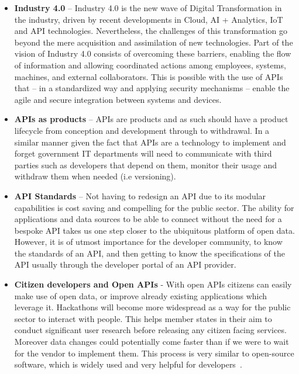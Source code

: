 \begin{itemize}
	\item \textbf{Industry 4.0} – Industry 4.0 is the new wave of Digital Transformation in the industry, driven by recent developments in Cloud, AI + Analytics, IoT and API technologies. Nevertheless, the challenges of this transformation go beyond the mere acquisition and assimilation of new technologies. Part of the vision of Industry 4.0 consists of overcoming these barriers, enabling the flow of information and allowing coordinated actions among employees, systems, machines, and external collaborators. This is possible with the use of APIs that – in a standardized way and applying security mechanisms – enable the agile and secure integration between systems and devices.~\citep{ind4}
	
	
	\item \textbf{APIs as products} – APIs are products and as such should have a
	product lifecycle from conception and development through to withdrawal.
	In a similar manner given the fact that APIs are a technology to implement and forget 
	government IT departments will need to communicate with third parties such as developers that depend on them,
	monitor their usage and withdraw them when needed (i.e versioning).
	
	\item \textbf{API Standards} – Not having to redesign an API due to its modular
	capabilities is cost saving and compelling for the public sector.
	The ability for applications and data sources to be able to connect without
	the need for a bespoke API takes us one step closer to the ubiquitous platform
	of open data. However, it is of utmost importance for the developer community, to know the standards of an API,
	and then getting to know the specifications of the API usually through the developer
	portal of an API provider.
	
	\item \textbf{Citizen developers and Open APIs} - With open APIs
	citizens can easily make use of	open data, or improve already existing applications which
	leverage it. Hackathons will become more widespread as a way for the public
	sector to interact with people. This helps member states in their aim to conduct significant user research before releasing any
	citizen facing services. Moreover data changes could potentially come
	faster than if we were to wait for the vendor to implement them. This process
	is very similar to open-source software, which is widely used and very
	helpful for developers~\citep{digital_first}.
	

\end{itemize}
